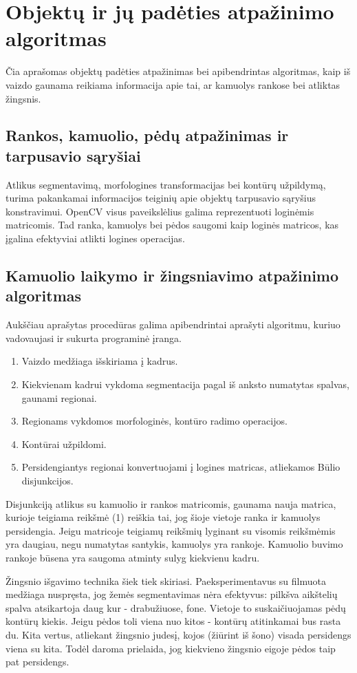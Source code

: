 \documentclass{VUMIFPSkursinis}
\begin{document}
\section{Objektų ir jų padėties atpažinimo algoritmas}
Čia aprašomas objektų padėties atpažinimas bei apibendrintas algoritmas, kaip iš vaizdo gaunama reikiama informacija apie tai, ar kamuolys rankose bei  atliktas žingsnis.
\subsection{Rankos, kamuolio, pėdų  atpažinimas ir tarpusavio sąryšiai}
Atlikus segmentavimą, morfologines transformacijas bei kontūrų užpildymą, turima pakankamai informacijos teiginių apie objektų tarpusavio sąryšius konstravimui.
OpenCV visus paveikslėlius galima reprezentuoti loginėmis matricomis. Tad ranka, kamuolys bei pėdos saugomi kaip loginės matricos, kas įgalina efektyviai atlikti logines operacijas.
\subsection{Kamuolio laikymo ir žingsniavimo atpažinimo algoritmas}
Aukščiau aprašytas procedūras galima apibendrintai aprašyti algoritmu, kuriuo vadovaujasi ir sukurta programinė įranga.
\begin{enumerate}
	\item Vaizdo medžiaga išskiriama į kadrus.  
	\item Kiekvienam kadrui vykdoma segmentacija pagal iš anksto numatytas spalvas, gaunami regionai. 
	\item Regionams vykdomos morfologinės, kontūro radimo operacijos.
	\item Kontūrai užpildomi.
	\item Persidengiantys regionai konvertuojami į logines matricas, atliekamos Būlio disjunkcijos.
\end{enumerate}

Disjunkciją atlikus su kamuolio ir rankos matricomis, gaunama nauja matrica, kurioje teigiama reikšmė (1) reiškia tai, jog šioje vietoje ranka ir kamuolys persidengia. Jeigu matricoje teigiamų reikšmių lyginant su visomis reikšmėmis yra daugiau, negu numatytas santykis, kamuolys yra rankoje. Kamuolio buvimo rankoje būsena yra saugoma atminty sulyg kiekvienu kadru.


Žingsnio išgavimo technika šiek tiek skiriasi. Paeksperimentavus su filmuota medžiaga nuspręsta, jog žemės segmentavimas nėra efektyvus: pilkšva aikštelių spalva atsikartoja daug kur - drabužiuose, fone. Vietoje to suskaičiuojamas pėdų kontūrų kiekis. Jeigu pėdos toli viena nuo kitos - kontūrų atitinkamai bus rasta du. Kita vertus, atliekant žingsnio judesį, kojos (žiūrint iš šono) visada persidengs viena su kita. Todėl daroma prielaida, jog kiekvieno žingsnio eigoje pėdos taip pat persidengs.
\end{document}
